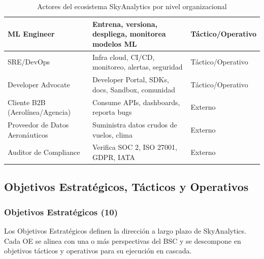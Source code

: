 ﻿\documentclass[11pt, letterpaper]{article}
\begin{document}
\begin{table}[H]
\begin{tabularx}{\linewidth}{>{\raggedright\arraybackslash}p{3.5cm} >{\raggedright\arraybackslash}X >{\raggedright\arraybackslash}p{2.5cm}}
\midrule

ML Engineer & Entrena, versiona, despliega, monitorea modelos ML & Táctico/Operativo \\

\midrule

SRE/DevOps & Infra cloud, CI/CD, monitoreo, alertas, seguridad & Táctico/Operativo \\

\midrule

Developer Advocate & Developer Portal, SDKs, docs, Sandbox, comunidad & Táctico/Operativo \\

\midrule

Cliente B2B (Aerolínea/Agencia) & Consume APIs, dashboards, reporta bugs & Externo \\

\midrule

Proveedor de Datos Aeronáuticos & Suministra datos crudos de vuelos, clima & Externo \\

\midrule

Auditor de Compliance & Verifica SOC 2, ISO 27001, GDPR, IATA & Externo \\

\bottomrule

\end{tabularx}

\caption{Actores del ecosistema SkyAnalytics por nivel organizacional}

\end{table}



\subsection{Objetivos Estratégicos, Tácticos y Operativos}



\subsubsection{Objetivos Estratégicos (10)}



Los Objetivos Estratégicos definen la dirección a largo plazo de SkyAnalytics. Cada OE se alinea con una o más perspectivas del BSC y se descompone en objetivos tácticos y operativos para su ejecución en cascada.
\end{document}
